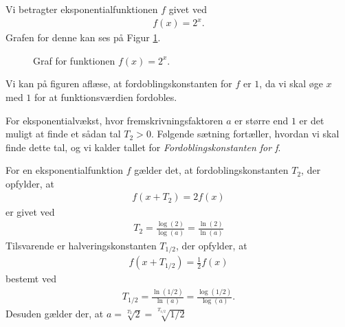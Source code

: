 \documentclass[12pt]{article}
\begin{document}
\begin{exa}
	Vi betragter eksponentialfunktionen $f$ givet ved
	\begin{align*}
		f(x) = 2^x.
	\end{align*}
	Grafen for denne kan ses på Figur \ref{fig:eksempel}.
	\begin{figure}[H]
		\centering
		\caption{Graf for funktionen $f(x) = 2^x$.}
		\label{fig:eksempel}
	\end{figure}
	Vi kan på figuren aflæse, at fordoblingskonstanten for $f$ er $1$, da vi skal øge $x$ med $1$ for at funktionsværdien fordobles. 
\end{exa}
For eksponentialvækst, hvor fremskrivningsfaktoren $a$ er større end $1$ er det muligt at finde et sådan tal $T_2>0$. Følgende sætning fortæller, hvordan vi skal finde dette tal, og vi kalder tallet for \textit{Fordoblingskonstanten for f}.
\begin{setn}
For en eksponentialfunktion $f$ gælder det, at fordoblingskonstanten $T_2$, der opfylder, at
\begin{align*}
f(x+T_2) = 2f(x)
\end{align*}
er givet ved 
\begin{align*}
T_2 = \frac{\log(2)}{\log(a)} = \frac{\ln(2)}{\ln(a)}
\end{align*}
Tilsvarende er halveringskonstanten $T_{1/2}$, der opfylder, at 
\begin{align*}
f(x+T_{1/2}) = \frac{1}{2}f(x)
\end{align*}
bestemt ved
\begin{align*}
T_{1/2} = \frac{\ln(1/2)}{\ln(a)} = \frac{\log(1/2)}{\log(a)}.
\end{align*}
Desuden gælder der, at $a = \sqrt[T_2]{2}= \sqrt[T_{1/2}]{1/2}$
\end{setn}
\end{document}
